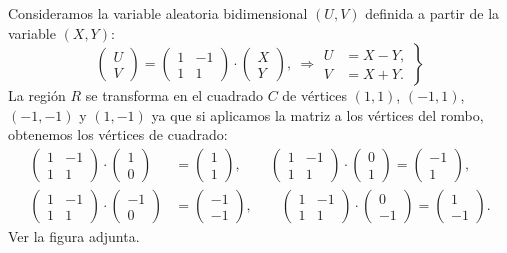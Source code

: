 \documentclass[]{book}
\begin{document}
Consideramos la variable aleatoria bidimensional \((U,V)\) definida a partir de la variable \((X,Y)\):
\[
\begin{pmatrix}U\\ V\end{pmatrix}=\begin{pmatrix}1 & -1\\ 1& 1\end{pmatrix}\cdot\begin{pmatrix}X\\ Y\end{pmatrix},\ \Rightarrow \left.\begin{array}{rl}U & = X-Y,\\ V & =X+Y.\end{array}\right\}
\]
La región \(R\) se transforma en el cuadrado \(C\) de vértices \((1,1)\), \((-1,1)\), \((-1,-1)\) y \((1,-1)\) ya que si aplicamos la matriz a los vértices del rombo, obtenemos los vértices de cuadrado:
\[
\begin{array}{rl}
\begin{pmatrix}1 & -1\\ 1& 1\end{pmatrix}\cdot \begin{pmatrix}1\\ 0\end{pmatrix} & =\begin{pmatrix}1\\ 1\end{pmatrix},\qquad 
\begin{pmatrix}1 & -1\\ 1& 1\end{pmatrix}\cdot \begin{pmatrix}0\\ 1\end{pmatrix}=\begin{pmatrix}-1\\ 1\end{pmatrix},\\ 
\begin{pmatrix}1 & -1\\ 1& 1\end{pmatrix}\cdot \begin{pmatrix}-1\\ 0\end{pmatrix} & =\begin{pmatrix}-1\\ -1\end{pmatrix},\qquad 
\begin{pmatrix}1 & -1\\ 1& 1\end{pmatrix}\cdot \begin{pmatrix}0\\ -1\end{pmatrix}=\begin{pmatrix}1\\ -1\end{pmatrix}.
\end{array}
\]
Ver la figura adjunta.
\end{document}
